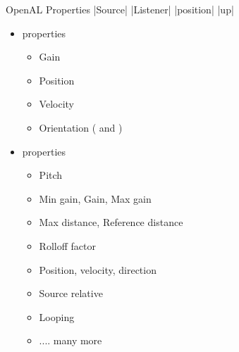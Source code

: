 \documentclass{beamer}
\begin{document}
\begin{frame}[fragile]{OpenAL Properties}
    |Source|
    |Listener|
    |position|
    |up|
    \begin{itemize}
        \item {\color{blue}} properties
              \begin{itemize}
                  \item Gain
                  \item Position
                  \item Velocity
                  \item Orientation ({\color{blue}} and {\color{blue}})
              \end{itemize}
        \item {\color{blue}} properties
              \begin{itemize}
                  \item Pitch
                  \item Min gain, Gain, Max gain
                  \item Max distance, Reference distance
                  \item Rolloff factor
                  \item Position, velocity, direction
                  \item Source relative
                  \item Looping
                  \item .... many more
              \end{itemize}
    \end{itemize}
\end{frame}
\end{document}
